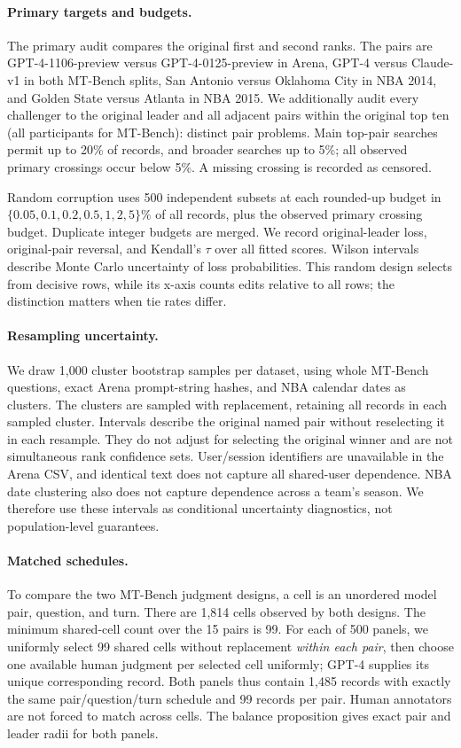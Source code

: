 \documentclass{article}
\begin{document}
\paragraph{Primary targets and budgets.}
The primary audit compares the original first and second ranks. The pairs are GPT-4-1106-preview versus GPT-4-0125-preview in Arena, GPT-4 versus Claude-v1 in both MT-Bench splits, San Antonio versus Oklahoma City in NBA 2014, and Golden State versus Atlanta in NBA 2015. We additionally audit every challenger to the original leader and all adjacent pairs within the original top ten (all participants for MT-Bench): \TestedPairs{} distinct pair problems. Main top-pair searches permit up to 20\% of records, and broader searches up to 5\%; all observed primary crossings occur below 5\%. A missing crossing is recorded as censored.

Random corruption uses 500 independent subsets at each rounded-up budget in $\{0.05,0.1,0.2,0.5,1,2,5\}\%$ of all records, plus the observed primary crossing budget. Duplicate integer budgets are merged. We record original-leader loss, original-pair reversal, and Kendall's $\tau$ over all fitted scores. Wilson intervals describe Monte Carlo uncertainty of loss probabilities. This random design selects from decisive rows, while its x-axis counts edits relative to all rows; the distinction matters when tie rates differ.

\paragraph{Resampling uncertainty.}
We draw 1,000 cluster bootstrap samples per dataset, using whole MT-Bench questions, exact Arena prompt-string hashes, and NBA calendar dates as clusters. The clusters are sampled with replacement, retaining all records in each sampled cluster. Intervals describe the original named pair without reselecting it in each resample. They do not adjust for selecting the original winner and are not simultaneous rank confidence sets. User/session identifiers are unavailable in the Arena CSV, and identical text does not capture all shared-user dependence. NBA date clustering also does not capture dependence across a team's season. We therefore use these intervals as conditional uncertainty diagnostics, not population-level guarantees.

\paragraph{Matched schedules.}
To compare the two MT-Bench judgment designs, a cell is an unordered model pair, question, and turn. There are 1,814 cells observed by both designs. The minimum shared-cell count over the 15 pairs is 99. For each of 500 panels, we uniformly select 99 shared cells without replacement \emph{within each pair}, then choose one available human judgment per selected cell uniformly; GPT-4 supplies its unique corresponding record. Both panels thus contain 1,485 records with exactly the same pair/question/turn schedule and 99 records per pair. Human annotators are not forced to match across cells. The balance proposition gives exact pair and leader radii for both panels.
\end{document}
